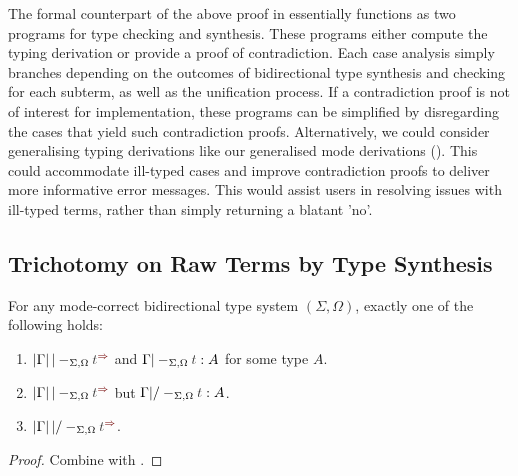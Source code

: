 The formal counterpart of the above proof in \Agda essentially functions as two programs for type checking and synthesis.
These programs either compute the typing derivation or provide a proof of contradiction.
Each case analysis simply branches depending on the outcomes of bidirectional type synthesis and checking for each subterm, as well as the unification process.
If a contradiction proof is not of interest for implementation, these programs can be simplified by disregarding the cases that yield such contradiction proofs.
Alternatively, we could consider generalising typing derivations like our generalised mode derivations ().
This could accommodate ill-typed cases and improve contradiction proofs to deliver more informative error messages.
This would assist users in resolving issues with ill-typed terms, rather than simply returning a blatant 'no'.

\subsection{Trichotomy on Raw Terms by Type Synthesis} \label{subsec:trichotomy}

\begin{corollary}\label{cor:trichotomy}
  For any mode-correct bidirectional type system $(\Sigma, \Omega)$, 
  exactly one of the following holds:
  \begin{enumerate}
    \item $\erase{\Gamma} |-_{\Sigma, \Omega} \isTerm{t}^{\syn}$ and\/ $\Gamma |-_{\Sigma, \Omega} \isTerm{t} : A$ for some type $A$.
    \item $\erase{\Gamma} |-_{\Sigma, \Omega} \isTerm{t}^{\syn}$ but\/ $\Gamma |/-_{\Sigma, \Omega} \isTerm{t} : A$.
    \item $\erase{\Gamma} |/-_{\Sigma, \Omega} \isTerm{t}^{\syn}$.
  \end{enumerate}
\end{corollary}
\begin{proof}
  Combine  with .
  
\end{proof}
